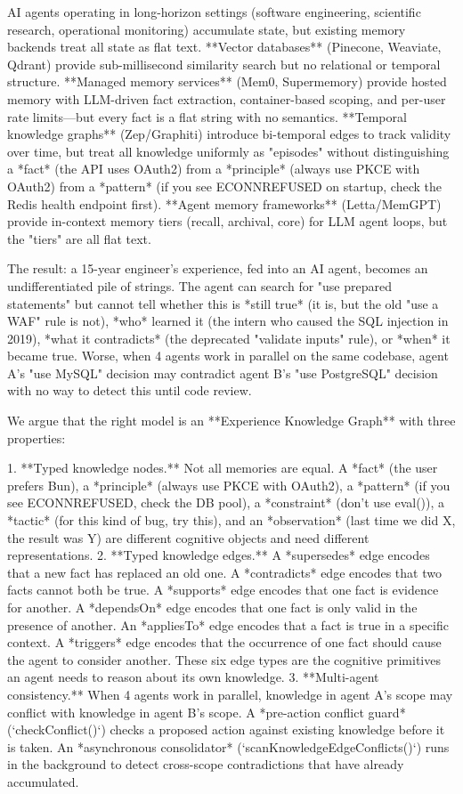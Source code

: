 AI agents operating in long-horizon settings (software engineering, scientific research, operational monitoring) accumulate state, but existing memory backends treat all state as flat text. **Vector databases** (Pinecone, Weaviate, Qdrant) provide sub-millisecond similarity search but no relational or temporal structure. **Managed memory services** (Mem0, Supermemory) provide hosted memory with LLM-driven fact extraction, container-based scoping, and per-user rate limits—but every fact is a flat string with no semantics. **Temporal knowledge graphs** (Zep/Graphiti) introduce bi-temporal edges to track validity over time, but treat all knowledge uniformly as "episodes" without distinguishing a *fact* (the API uses OAuth2) from a *principle* (always use PKCE with OAuth2) from a *pattern* (if you see ECONNREFUSED on startup, check the Redis health endpoint first). **Agent memory frameworks** (Letta/MemGPT) provide in-context memory tiers (recall, archival, core) for LLM agent loops, but the "tiers" are all flat text.

The result: a 15-year engineer's experience, fed into an AI agent, becomes an undifferentiated pile of strings. The agent can search for "use prepared statements" but cannot tell whether this is *still true* (it is, but the old "use a WAF" rule is not), *who* learned it (the intern who caused the SQL injection in 2019), *what it contradicts* (the deprecated "validate inputs" rule), or *when* it became true. Worse, when 4 agents work in parallel on the same codebase, agent A's "use MySQL" decision may contradict agent B's "use PostgreSQL" decision with no way to detect this until code review.

We argue that the right model is an **Experience Knowledge Graph** with three properties:

1. **Typed knowledge nodes.** Not all memories are equal. A *fact* (the user prefers Bun), a *principle* (always use PKCE with OAuth2), a *pattern* (if you see ECONNREFUSED, check the DB pool), a *constraint* (don't use eval()), a *tactic* (for this kind of bug, try this), and an *observation* (last time we did X, the result was Y) are different cognitive objects and need different representations.
2. **Typed knowledge edges.** A *supersedes* edge encodes that a new fact has replaced an old one. A *contradicts* edge encodes that two facts cannot both be true. A *supports* edge encodes that one fact is evidence for another. A *dependsOn* edge encodes that one fact is only valid in the presence of another. An *appliesTo* edge encodes that a fact is true in a specific context. A *triggers* edge encodes that the occurrence of one fact should cause the agent to consider another. These six edge types are the cognitive primitives an agent needs to reason about its own knowledge.
3. **Multi-agent consistency.** When 4 agents work in parallel, knowledge in agent A's scope may conflict with knowledge in agent B's scope. A *pre-action conflict guard* (`checkConflict()`) checks a proposed action against existing knowledge before it is taken. An *asynchronous consolidator* (`scanKnowledgeEdgeConflicts()`) runs in the background to detect cross-scope contradictions that have already accumulated.

